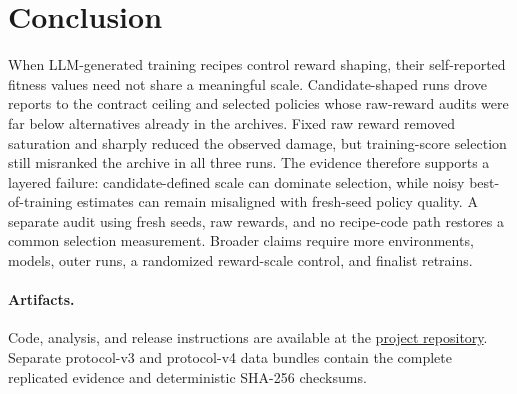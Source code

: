 \documentclass[11pt]{article}
\begin{document}
\section{Conclusion}

When LLM-generated training recipes control reward shaping, their self-reported fitness values
need not share a meaningful scale. Candidate-shaped runs drove reports to the contract ceiling and
selected policies whose raw-reward audits were far below alternatives already in the archives.
Fixed raw reward removed saturation and sharply reduced the observed damage, but training-score
selection still misranked the archive in all three runs. The evidence therefore supports a layered
failure: candidate-defined scale can dominate selection, while noisy best-of-training estimates
can remain misaligned with fresh-seed policy quality. A separate audit using fresh seeds, raw
rewards, and no recipe-code path restores a common selection measurement. Broader claims require
more environments, models, outer runs, a randomized reward-scale control, and finalist retrains.

\paragraph{Artifacts.}
Code, analysis, and release instructions are available at
the \href{https://github.com/Frankiegan912/shinsa-evolve}{project repository}. Separate protocol-v3
and protocol-v4 data bundles contain the complete replicated evidence and deterministic SHA-256
checksums.

\small


\end{document}
